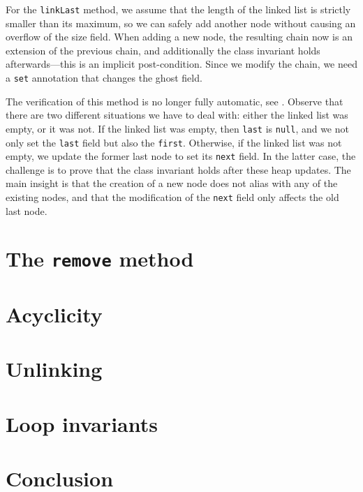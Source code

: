 \documentclass[runningheads]{llncs}
\begin{document}


For the \texttt{linkLast} method, we assume that the length of the linked list is strictly smaller than its maximum, so we can safely add another node without causing an overflow of the size field. When adding a new node, the resulting chain now is an extension of the previous chain, and additionally the class invariant holds afterwards---this is an implicit post-condition. Since we modify the chain, we need a \texttt{set} annotation that changes the ghost field.



The verification of this method is no longer fully automatic, see \cite[1:25--6:52]{Bian2019addbranch}. Observe that there are two different situations we have to deal with: either the linked list was empty, or it was not. If the linked list was empty, then \texttt{last} is \texttt{null}, and we not only set the \texttt{last} field but also the \texttt{first}. Otherwise, if the linked list was not empty, we update the former last node to set its \texttt{next} field. In the latter case, the challenge is to prove that the class invariant holds after these heap updates. The main insight is that the creation of a new node does not alias with any of the existing nodes, and that the modification of the \texttt{next} field only affects the old last node.

\section{The \texttt{remove} method}\label{sec:remove}
\section{Acyclicity}\label{sec:acyclicity}
\section{Unlinking}\label{sec:unlinking}
\section{Loop invariants}\label{sec:loop-invariant}
\section{Conclusion}\label{sec:conclusion}



\end{document}
